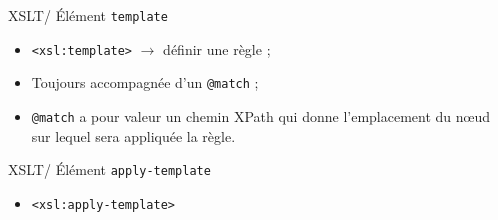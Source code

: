 \documentclass{beamer}
\begin{document}
        \begin{frame}[fragile]{XSLT/ Élément \texttt{template}}
    \Large
        \begin{itemize}
            \item \texttt{<xsl:template>} $\rightarrow$ définir une règle ;
            \item Toujours accompagnée d'un \texttt{@match} ;
            \item \texttt{@match} a pour valeur un chemin XPath qui donne l'emplacement du n\oe ud sur lequel sera appliquée la règle.
        \end{itemize}
    \end{frame}

        \begin{frame}[fragile]{XSLT/ Élément \texttt{apply-template}}
    \Large
        \begin{itemize}
            \item \texttt{<xsl:apply-template>}
        \end{itemize}
    \end{frame}
\end{document}
